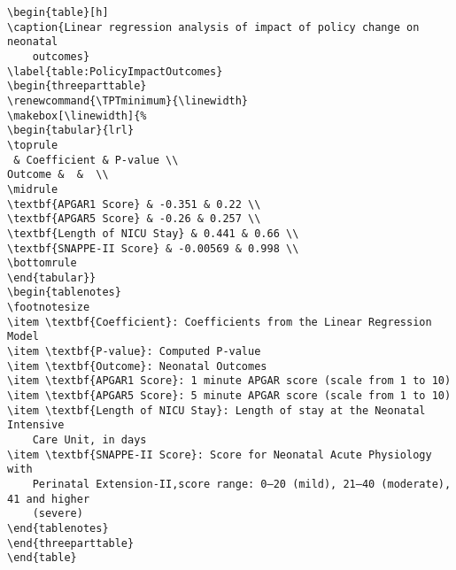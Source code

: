 \documentclass[11pt]{article}
\begin{document}
\begin{Verbatim}[tabsize=4]
\begin{table}[h]
\caption{Linear regression analysis of impact of policy change on neonatal
	outcomes}
\label{table:PolicyImpactOutcomes}
\begin{threeparttable}
\renewcommand{\TPTminimum}{\linewidth}
\makebox[\linewidth]{%
\begin{tabular}{lrl}
\toprule
 & Coefficient & P-value \\
Outcome &  &  \\
\midrule
\textbf{APGAR1 Score} & -0.351 & 0.22 \\
\textbf{APGAR5 Score} & -0.26 & 0.257 \\
\textbf{Length of NICU Stay} & 0.441 & 0.66 \\
\textbf{SNAPPE-II Score} & -0.00569 & 0.998 \\
\bottomrule
\end{tabular}}
\begin{tablenotes}
\footnotesize
\item \textbf{Coefficient}: Coefficients from the Linear Regression Model
\item \textbf{P-value}: Computed P-value
\item \textbf{Outcome}: Neonatal Outcomes
\item \textbf{APGAR1 Score}: 1 minute APGAR score (scale from 1 to 10)
\item \textbf{APGAR5 Score}: 5 minute APGAR score (scale from 1 to 10)
\item \textbf{Length of NICU Stay}: Length of stay at the Neonatal Intensive
	Care Unit, in days
\item \textbf{SNAPPE-II Score}: Score for Neonatal Acute Physiology with
	Perinatal Extension-II,score range: 0–20 (mild), 21–40 (moderate), 41 and higher
	(severe)
\end{tablenotes}
\end{threeparttable}
\end{table}

\end{Verbatim}




\end{document}
